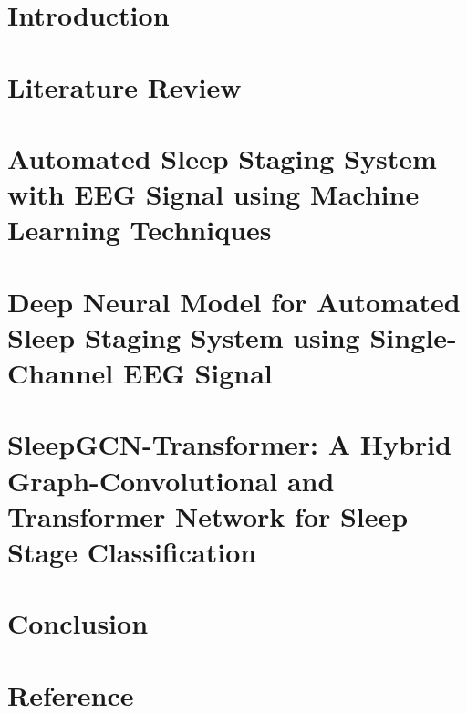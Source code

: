 \documentclass[12pt,a4paper]{report}
\begin{document}
	\pagestyle{plain}\clearpage
        \thispagestyle{empty}
	

         \pagestyle{plain}\clearpage
        \thispagestyle{empty}
	
      



        
	\thispagestyle{empty}
	
	\clearpage\thispagestyle{empty}

\clearpage\thispagestyle{empty}
	
	\thispagestyle{empty}
 
	
	\thispagestyle{empty}
	
        	\tableofcontents
	\listoffigures
	\listoftables
 
    
	\cleardoublepage{}
	\pagestyle{fancy}

	\chapter[Introduction]{Introduction}
	\label{chapter1}
	
	
	\chapter[Literature Review]{Literature Review}
	\label{chapter2}
	
	

\chapter{Automated Sleep Staging System with EEG Signal using Machine Learning Techniques}
\label{chapter_paper1}


\chapter{Deep Neural Model for Automated Sleep Staging System using Single-Channel EEG Signal}
\label{chapter_paper2}


\chapter{SleepGCN-Transformer: A Hybrid Graph-Convolutional and Transformer Network for Sleep Stage Classification}
\label{chapter_paper3}

	
	\chapter[Conclusion]{Conclusion}
	\pagestyle{plain}
 

\chapter [Reference] {Reference}
		\pagestyle{plain}
	 




 
        \clearpage\thispagestyle{empty}
\end{document}
